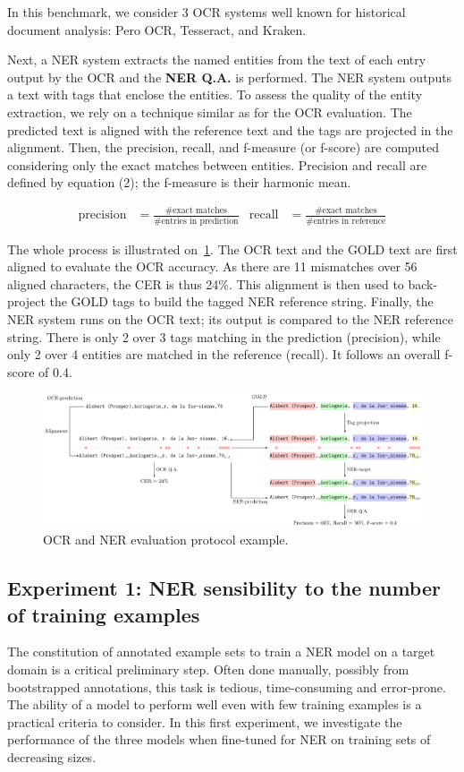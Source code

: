 In this benchmark, we consider 3 OCR systems well known for historical document analysis: Pero OCR, Tesseract, and Kraken. 


Next, a NER system extracts the named entities from the text of each entry output by the OCR and the \textbf{NER Q.A.}
is performed. The NER system outputs a text with tags that enclose the entities. To assess the quality of the entity
extraction, we rely on a technique similar as for the OCR evaluation. The predicted text is aligned with the reference
text and the tags are projected in the alignment. Then, the precision, recall, and f-measure (or f-score) are computed considering
only the exact matches between entities. Precision and recall are defined by equation (2); the f-measure is their harmonic mean.

\begin{align}
    \mathrm{precision} &= \frac{\text{\#exact matches}}{\text{\#entries in prediction}} & \mathrm{recall} &= \frac{\text{\#exact matches}}{\text{\#entries in reference}}
\end{align}


The whole process is illustrated on~\cref{fig.eval-ocr-ner}. The OCR text and the GOLD text are first aligned to
evaluate the OCR accuracy. As there are 11 mismatches over 56 aligned characters, the CER is thus 24\%. This alignment
is then used to back-project the GOLD tags to build the tagged NER reference string. Finally, the NER system runs on the
OCR text; its output is compared to the NER reference string. There is only 2 over 3 tags matching in the prediction (precision),
while only 2 over 4 entities are matched in the reference (recall). It follows an overall f-score of 0.4.

\begin{figure}[tb]
    \includegraphics[width=\linewidth]{figs/eval-ocr-ner.pdf}
    \caption{OCR and NER evaluation protocol example.}
    \label{fig.eval-ocr-ner}
\end{figure}


\subsection{Experiment 1: NER sensibility to the number of training examples}
\label{subsection:experiment-1-setup}
The constitution of annotated example sets to train a NER model on a target domain is a critical preliminary step.
Often done manually, possibly from bootstrapped annotations, this task is tedious, time-consuming and error-prone.
The ability of a model to perform well even with few training examples is a practical criteria to consider.
In this first experiment, we investigate the performance of the three models when fine-tuned for NER on training sets of decreasing sizes.

